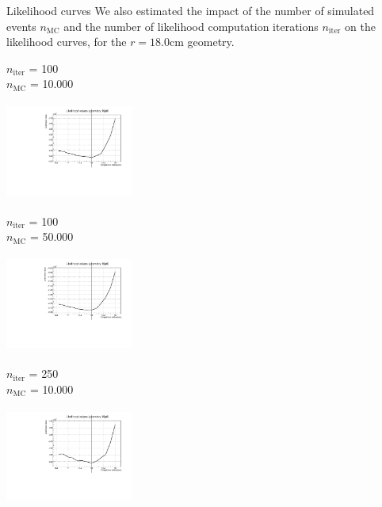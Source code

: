 \documentclass[8 pt]{beamer}
\begin{document}
\begin{frame}{Likelihood curves}
\justifying
We also estimated the impact of the number of simulated events $n_{\text{MC}}$ and the number of likelihood computation iterations $n_{\text{iter}}$ on the likelihood curves, for the $r = 18.0$cm geometry. \vfill

\begin{minipage}[c]{.32\textwidth}
\begin{exampleblock}{} \begin{center}$n_\text{iter}$ = 100 \\ $n_\text{MC}$ = 10.000 \end{center} \end{exampleblock} \vspace{5pt}
\includegraphics[width=4.2cm, height=3.2cm]{figs/likelihood100LowStat/likelihood18p0.pdf} 
\end{minipage}
\begin{minipage}[c]{.32\textwidth}
\begin{exampleblock}{} \begin{center}$n_\text{iter}$ = 100 \\ $n_\text{MC}$ = 50.000\end{center} \end{exampleblock} \vspace{5pt}
\includegraphics[width=4.2cm, height=3.2cm]{figs/likelihood100HighStat/likelihood18p0.pdf} 
\end{minipage}
\begin{minipage}[c]{.32\textwidth}
\begin{exampleblock}{} \begin{center}$n_\text{iter}$ = 250 \\ $n_\text{MC}$ = 10.000 \end{center} \end{exampleblock} \vspace{5pt}
\includegraphics[width=4.2cm, height=3.2cm]{figs/likelihood250LowStat/likelihood18p0.pdf} 
\end{minipage} \vfill


\end{frame}
\end{document}
